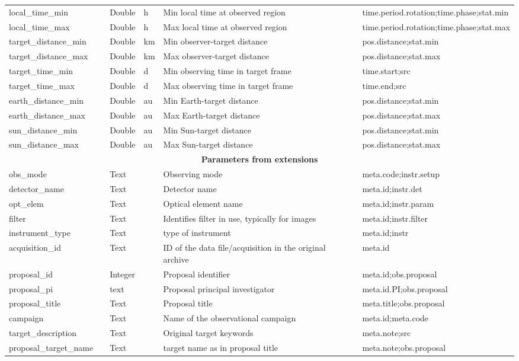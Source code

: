 \documentclass[11pt,a4paper]{ivoa}
\begin{document}
\begin{longtable}{p{3.5cm}p{0.5cm}p{1cm}p{1cm}p{7cm}p{3cm}}
local\_time\_min&&Double&h&Min local time at observed region&time.period.rotation;time.phase;stat.min\\
local\_time\_max&&Double&h&Max local time at observed region&time.period.rotation;time.phase;stat.max \\
target\_distance\_min&&Double&km&Min observer-target distance&pos.distance;stat.min\\
target\_distance\_max&&Double&km&Max observer-target distance&pos.distance;stat.max\\
target\_time\_min&&Double&d&Min observing time in target frame&time.start;src\\
target\_time\_max&&Double&d&Max observing time in target frame&time.end;src\\
earth\_distance\_min&&Double&au&Min Earth-target distance&pos.distance;stat.min\\
earth\_distance\_max&&Double&au&Max Earth-target distance&pos.distance;stat.max\\
sun\_distance\_min&&Double&au&Min Sun-target distance&pos.distance;stat.min\\
sun\_distance\_max&&Double&au&Max Sun-target distance&pos.distance;stat.max\\
\multicolumn{6}{c}{\vrule width 0pt height 20pt depth 12pt \textbf{\textbf{Parameters from extensions}}}\\
obs\_mode&&Text&&Observing mode&meta.code;instr.setup\\
detector\_name&&Text&&Detector name&meta.id;instr.det\\
opt\_elem&&Text&&Optical element name&meta.id;instr.param\\
filter&&Text& &Identifies filter in use, typically for images&meta.id;instr.filter\\
instrument\_type&&Text&&type of instrument&meta.id;instr\\
acquisition\_id&&Text&&ID of the data file/acquisition in the original archive&meta.id\\
proposal\_id&&Integer&&Proposal identifier&meta.id;obs.proposal\\
proposal\_pi&&text&&Proposal principal investigator&meta.id.PI;obs.proposal\\
proposal\_title&&Text&&Proposal title&meta.title;obs.proposal\\
campaign&&Text&&Name of the observational campaign&meta.id;meta.code\\
target\_description&&Text&&Original target keywords&meta.note;src\\
proposal\_target\_name&&Text&&target name as in proposal title&meta.note;obs.proposal\\

\end{longtable}
\end{document}
